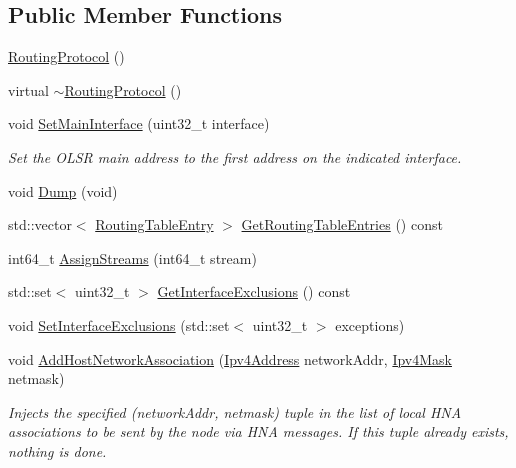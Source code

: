 \subsection*{Public Member Functions}
\begin{DoxyCompactItemize}
\item 
\hyperlink{classns3_1_1olsr_1_1RoutingProtocol_a3415aee30083fbfc432e985ec1e68125}{Routing\+Protocol} ()
\item 
virtual \hyperlink{classns3_1_1olsr_1_1RoutingProtocol_ac1b31c560c42e7b29fb6fee30df1c9bd}{$\sim$\+Routing\+Protocol} ()
\item 
void \hyperlink{classns3_1_1olsr_1_1RoutingProtocol_a688aa2a34930b4132f500d9d6c253f0e}{Set\+Main\+Interface} (uint32\+\_\+t interface)
\begin{DoxyCompactList}\small\item\em Set the O\+L\+SR main address to the first address on the indicated interface. \end{DoxyCompactList}\item 
void \hyperlink{classns3_1_1olsr_1_1RoutingProtocol_ac4958795cfe7a164514c3e1a09e159ab}{Dump} (void)
\item 
std\+::vector$<$ \hyperlink{structns3_1_1olsr_1_1RoutingTableEntry}{Routing\+Table\+Entry} $>$ \hyperlink{classns3_1_1olsr_1_1RoutingProtocol_a81a605ea088a3508a27414a263a725af}{Get\+Routing\+Table\+Entries} () const 
\item 
int64\+\_\+t \hyperlink{classns3_1_1olsr_1_1RoutingProtocol_aa4c678c146b32eafc73ae404a3a8103f}{Assign\+Streams} (int64\+\_\+t stream)
\item 
std\+::set$<$ uint32\+\_\+t $>$ \hyperlink{classns3_1_1olsr_1_1RoutingProtocol_af49d8e372249668ec53cf329a4cf2253}{Get\+Interface\+Exclusions} () const 
\item 
void \hyperlink{classns3_1_1olsr_1_1RoutingProtocol_ac835a5b09eceb7c7168a953b640cac5c}{Set\+Interface\+Exclusions} (std\+::set$<$ uint32\+\_\+t $>$ exceptions)
\item 
void \hyperlink{classns3_1_1olsr_1_1RoutingProtocol_a330fa7cafeb6258b6ef816e5b54e0327}{Add\+Host\+Network\+Association} (\hyperlink{classns3_1_1Ipv4Address}{Ipv4\+Address} network\+Addr, \hyperlink{classns3_1_1Ipv4Mask}{Ipv4\+Mask} netmask)
\begin{DoxyCompactList}\small\item\em Injects the specified (network\+Addr, netmask) tuple in the list of local H\+NA associations to be sent by the node via H\+NA messages. If this tuple already exists, nothing is done. \end{DoxyCompactList}\item 

\end{DoxyCompactItemize}
